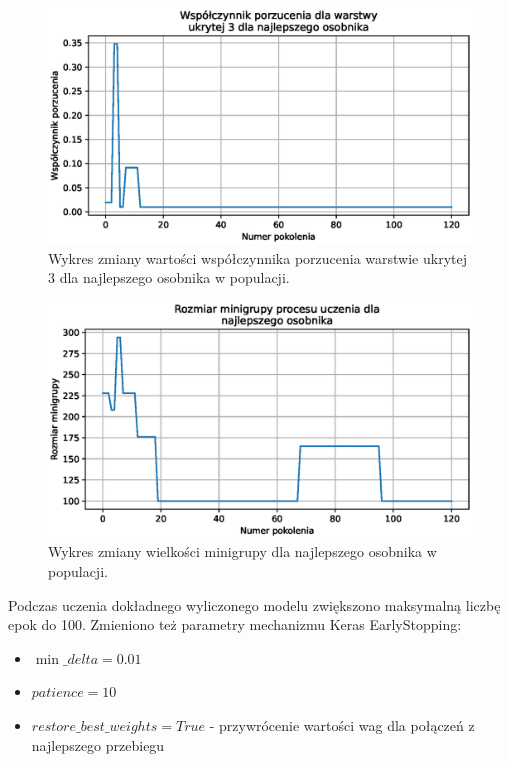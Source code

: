 \documentclass[a4paper,12pt]{article}
\numberwithin{figure}{section}
\begin{document}
    \begin{figure}[H]
        \centering
        \includegraphics[width=\textwidth]{g_a_best_hidden_3_dropout_rate}
        \caption{Wykres zmiany wartości współczynnika porzucenia warstwie ukrytej 3 dla najlepszego osobnika w populacji.}
        \label{fig:g_a_best_hidden_3_dropout_rate}
    \end{figure}

    \smallskip

    \begin{figure}[H]
        \centering
        \includegraphics[width=\textwidth]{g_a_best_batch_size}
        \caption{Wykres zmiany wielkości minigrupy dla najlepszego osobnika w populacji.}
        \label{fig:g_a_best_batch_size}
    \end{figure}

    \bigskip

    Podczas uczenia dokładnego wyliczonego modelu zwiększono maksymalną liczbę epok do 100. Zmieniono też parametry mechanizmu Keras EarlyStopping:
    \begin{itemize}
        \item $\min\_delta=0.01$
        \item $patience=10$
        \item $restore\_best\_weights=True$ - przywrócenie wartości wag dla połączeń z najlepszego przebiegu
    \end{itemize}
\end{document}
